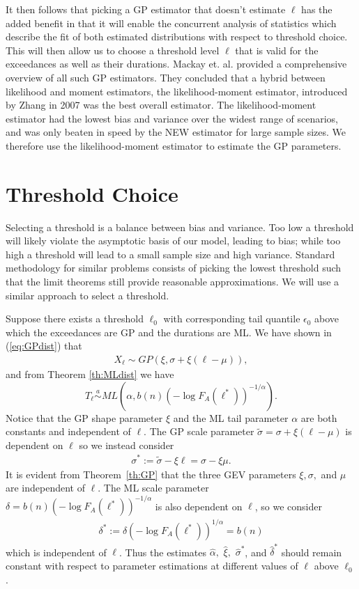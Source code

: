 \documentclass[honours,12pt,twoside, openright]{unswthesis}
\newcommand{\1}{\mathbf 1}
\numberwithin{equation}{section}
\theoremstyle{definition}
\theoremstyle{remark}
\begin{document}
It then follows that picking a GP estimator that doesn't estimate $\ell$ has the added benefit in that it will enable the concurrent analysis of statistics which describe the fit of both estimated distributions with respect to threshold choice. This will then allow us to choose a threshold level $\ell$ that is valid for the exceedances as well as their durations. Mackay et. al. \cite{Mackay2011} provided a comprehensive overview of all such GP estimators. They concluded that a hybrid between likelihood and moment estimators, the likelihood-moment estimator, introduced by Zhang in 2007 \cite{Zhang2007} was the best overall estimator. The likelihood-moment estimator had the lowest bias and variance over the widest range of scenarios, and was only beaten in speed by the NEW estimator \cite{Zhang2009} for large sample sizes. We therefore use the likelihood-moment estimator to estimate the GP parameters.

\section{Threshold Choice}
Selecting a threshold is a balance between bias and variance. Too low a threshold will likely violate the asymptotic basis of our model, leading to bias; while too high a threshold will lead to a small sample size and high variance. Standard methodology for similar problems consists of picking the lowest threshold such that the limit theorems still provide reasonable approximations. We will use a similar approach to select a threshold. 

Suppose there exists a threshold $\ell_0$ with corresponding tail quantile $\epsilon_0$ above which the exceedances are GP and the durations are ML. We have shown in (\ref{eq:GPdist}) that
\begin{align*}
X_\ell\sim GP(\xi,\sigma+\xi(\ell-\mu)),
\end{align*}
and from Theorem \ref{th:MLdist} we have
\[
	T_\ell\overset{a}{\sim}ML\left(\alpha, b(n)(-\log F_A(\ell^*))^{-1/\alpha}\right).
\]
Notice that the GP shape parameter $\xi$ and the ML tail parameter $\alpha$ are both constants and independent of $\ell$. The GP scale parameter $\tilde \sigma = \sigma+\xi(\ell-\mu)$ is dependent on $\ell$ so we instead consider
\begin{align}\label{eq:sigmaStar}
	\sigma^{*}:=\tilde \sigma -\xi\ell= \sigma-\xi\mu.
\end{align}  
It is evident from Theorem~\ref{th:GP} that the three GEV parameters $\xi,\sigma,$ and $\mu$ are independent of $\ell$. The ML scale parameter $\delta=b(n)(-\log F_A(\ell^*))^{-1/\alpha}$ is also dependent on $\ell$, so we consider
\begin{align}\label{eq:deltaStar}
	\delta^{*}:=\delta(-\log F_A(\ell^*))^{1/\alpha}=b(n)
\end{align}  
which is independent of $\ell$. Thus the estimates $\hat\alpha,$ $\hat\xi,$ $\hat\sigma^{*}$, and $\hat\delta^{*}$ should remain constant with respect to parameter estimations at different values of $\ell$ above $\ell_0$.
\end{document}
